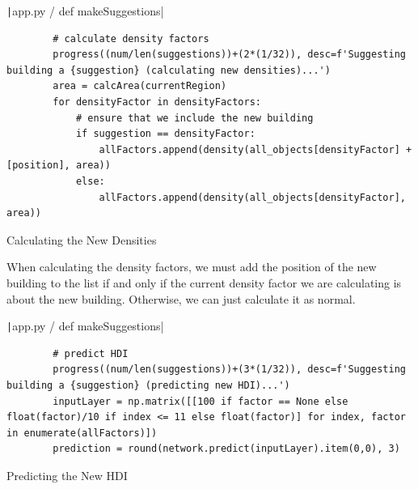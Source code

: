 \documentclass[12pt]{report}
\newcommand{\pil}[1]{\protect\texttt|#1|}
\begin{document}
\begin{listing}[H]
\pil{app.py / def makeSuggestions}
\begin{verbatim}
        # calculate density factors
        progress((num/len(suggestions))+(2*(1/32)), desc=f'Suggesting building a {suggestion} (calculating new densities)...')
        area = calcArea(currentRegion)
        for densityFactor in densityFactors:
            # ensure that we include the new building
            if suggestion == densityFactor:
                allFactors.append(density(all_objects[densityFactor] + [position], area))
            else:
                allFactors.append(density(all_objects[densityFactor], area))
\end{verbatim}
\caption{Calculating the New Densities}\label{cs:newDensities}
\end{listing}

When calculating the density factors, we must add the position of the new building to the list if and only if the current density factor we are calculating is about the new building. Otherwise, we can just calculate it as normal.

\begin{center}
\end{center}

\begin{listing}[H]
\pil{app.py / def makeSuggestions}
\begin{verbatim}
        # predict HDI
        progress((num/len(suggestions))+(3*(1/32)), desc=f'Suggesting building a {suggestion} (predicting new HDI)...')
        inputLayer = np.matrix([[100 if factor == None else float(factor)/10 if index <= 11 else float(factor)] for index, factor in enumerate(allFactors)])
        prediction = round(network.predict(inputLayer).item(0,0), 3)
\end{verbatim}
\caption{Predicting the New HDI}\label{cs:newHDI}
\end{listing}
\end{document}
